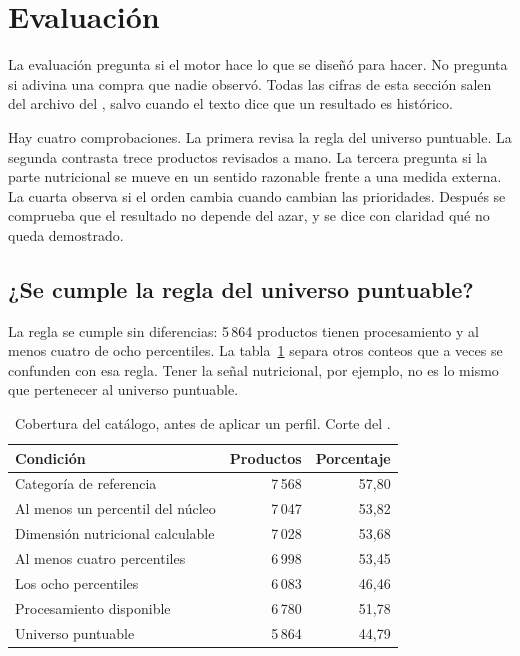 \section{Evaluación}
\label{sec:evaluacion}

La evaluación pregunta si el motor hace lo que se diseñó para hacer. No pregunta si adivina una compra que nadie observó. Todas las cifras de esta sección salen del archivo del \corte, salvo cuando el texto dice que un resultado es histórico.

Hay cuatro comprobaciones. La primera revisa la regla del universo puntuable. La segunda contrasta trece productos revisados a mano. La tercera pregunta si la parte nutricional se mueve en un sentido razonable frente a una medida externa. La cuarta observa si el orden cambia cuando cambian las prioridades. Después se comprueba que el resultado no depende del azar, y se dice con claridad qué no queda demostrado.

\subsection{¿Se cumple la regla del universo puntuable?}

La regla se cumple sin diferencias: 5\,864 productos tienen procesamiento y al menos cuatro de ocho percentiles. La tabla~\ref{tab:cobertura} separa otros conteos que a veces se confunden con esa regla. Tener la señal nutricional, por ejemplo, no es lo mismo que pertenecer al universo puntuable.

\begin{table}[ht]
  \centering
  \caption{Cobertura del catálogo, antes de aplicar un perfil. Corte del \corte.}
  \label{tab:cobertura}
  \begin{tabular}{lrr}
    \toprule
    Condición & Productos & Porcentaje \\
    \midrule
    Categoría de referencia & 7\,568 & 57{,}80 \\
    Al menos un percentil del núcleo & 7\,047 & 53{,}82 \\
    Dimensión nutricional calculable & 7\,028 & 53{,}68 \\
    Al menos cuatro percentiles & 6\,998 & 53{,}45 \\
    Los ocho percentiles & 6\,083 & 46{,}46 \\
    Procesamiento disponible & 6\,780 & 51{,}78 \\
    Universo puntuable & 5\,864 & 44{,}79 \\
    \bottomrule
  \end{tabular}
\end{table}

